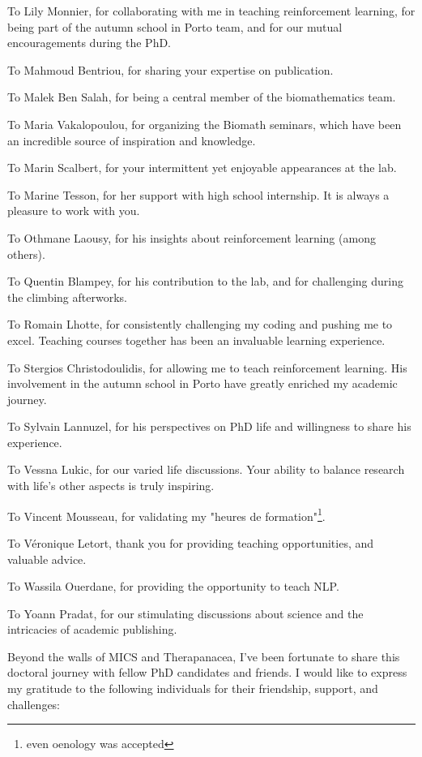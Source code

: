 To Lily Monnier, for collaborating with me in teaching reinforcement learning, for being part of the autumn school in Porto team, and for our mutual encouragements during the PhD.

To Mahmoud Bentriou, for sharing your expertise on publication.

To Malek Ben Salah, for being a central member of the biomathematics team.

To Maria Vakalopoulou, for organizing the Biomath seminars, which have been an incredible source of inspiration and knowledge.

To Marin Scalbert, for your intermittent yet enjoyable appearances at the lab.

To Marine Tesson, for her support with high school internship.
It is always a pleasure to work with you.


To Othmane Laousy, for his insights about reinforcement learning (among others).

To Quentin Blampey, for his contribution to the lab, and for challenging during the climbing afterworks.

To Romain Lhotte, for consistently challenging my coding and pushing me to excel.
Teaching courses together has been an invaluable learning experience.

To Stergios Christodoulidis, for allowing me to teach reinforcement learning.
His involvement in the autumn school in Porto have greatly enriched my academic journey.

To Sylvain Lannuzel, for his perspectives on PhD life and willingness to share his experience.

To Vessna Lukic, for our varied life discussions.
Your ability to balance research with life's other aspects is truly inspiring.

To Vincent Mousseau, for validating my "heures de formation"\footnote{even oenology was accepted}.

To Véronique Letort, thank you for providing teaching opportunities, and valuable advice.

To Wassila Ouerdane, for providing the opportunity to teach NLP.

To Yoann Pradat, for our stimulating discussions about science and the intricacies of academic publishing.



Beyond the walls of MICS and Therapanacea, I've been fortunate to share this doctoral journey with fellow PhD candidates and friends.
I would like to express my gratitude to the following individuals for their friendship, support, and challenges:

